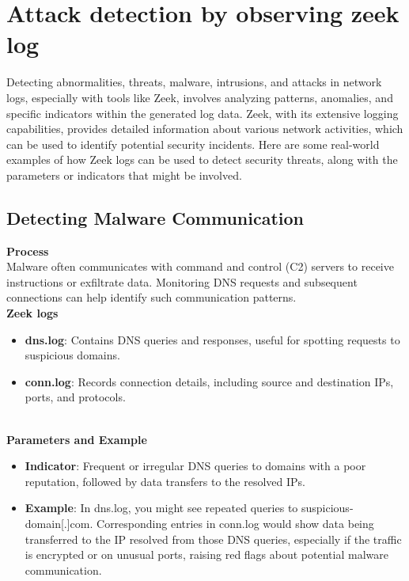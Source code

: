 \section{Attack detection by observing zeek log}
Detecting abnormalities, threats, malware, intrusions, and attacks in network logs, especially with tools like Zeek, involves analyzing patterns, anomalies, and specific indicators within the generated log data. Zeek, with its extensive logging capabilities, provides detailed information about various network activities, which can be used to identify potential security incidents. Here are some real-world examples of how Zeek logs can be used to detect security threats, along with the parameters or indicators that might be involved.

\subsection{Detecting Malware Communication}
\textbf{Process}
\vspace{8pt}
\\
Malware often communicates with command and control (C2) servers to receive instructions or exfiltrate data. Monitoring DNS requests and subsequent connections can help identify such communication patterns.
\vspace{10pt}
\\

\noindent \textbf{Zeek logs}
\begin{itemize}
    \item \textbf{dns.log}: Contains DNS queries and responses, useful for spotting requests to suspicious domains.
    \item \textbf{conn.log}: Records connection details, including source and destination IPs, ports, and protocols.
\end{itemize}
\vspace{10pt}
\\


\noindent \textbf{Parameters and Example}
\begin{itemize}
    \item \textbf{Indicator}: Frequent or irregular DNS queries to domains with a poor reputation, followed by data transfers to the resolved IPs.
    \item \textbf{Example}: In dns.log, you might see repeated queries to suspicious-domain[.]com. Corresponding entries in conn.log would show data being transferred to the IP resolved from those DNS queries, especially if the traffic is encrypted or on unusual ports, raising red flags about potential malware communication.
\end{itemize}

